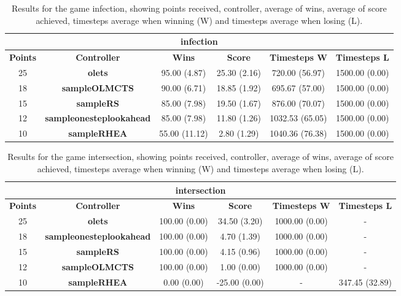 \begin{table*}[!t]
\begin{center}
\begin{tabular}{|c|c|c|c|c|c|}
\multicolumn{6}{c}{\textbf{infection}}\\
\hline
\textbf{Points} & \textbf{Controller} & \textbf{Wins} &  \textbf{Score} & \textbf{Timesteps W} & \textbf{Timesteps L}\\
\hline
25 & \textbf{olets} & 95.00 (4.87) & 25.30 (2.16) & 720.00 (56.97) & 1500.00 (0.00)
 \\
\hline
18 & \textbf{sampleOLMCTS} & 90.00 (6.71) & 18.85 (1.92) & 695.67 (57.00) & 1500.00 (0.00)
 \\
\hline
15 & \textbf{sampleRS} & 85.00 (7.98) & 19.50 (1.67) & 876.00 (70.07) & 1500.00 (0.00)
 \\
\hline
12 & \textbf{sampleonesteplookahead} & 85.00 (7.98) & 11.80 (1.26) & 1032.53 (65.05) & 1500.00 (0.00)
 \\
\hline
10 & \textbf{sampleRHEA} & 55.00 (11.12) & 2.80 (1.29) & 1040.36 (76.38) & 1500.00 (0.00)
 \\
\hline
\end{tabular}
\caption{Results for the game infection, showing points received, controller, average of wins, average of score achieved, timesteps average when winning (W) and timesteps average when losing (L).}
\label{tab:weights}
\end{center}
\end{table*}
\begin{table*}[!t]
\begin{center}
\begin{tabular}{|c|c|c|c|c|c|}
\multicolumn{6}{c}{\textbf{intersection}}\\
\hline
\textbf{Points} & \textbf{Controller} & \textbf{Wins} &  \textbf{Score} & \textbf{Timesteps W} & \textbf{Timesteps L}\\
\hline
25 & \textbf{olets} & 100.00 (0.00) & 34.50 (3.20) & 1000.00 (0.00) &  - 
 \\
\hline
18 & \textbf{sampleonesteplookahead} & 100.00 (0.00) & 4.70 (1.39) & 1000.00 (0.00) &  - 
 \\
\hline
15 & \textbf{sampleRS} & 100.00 (0.00) & 4.15 (0.96) & 1000.00 (0.00) &  - 
 \\
\hline
12 & \textbf{sampleOLMCTS} & 100.00 (0.00) & 1.00 (0.00) & 1000.00 (0.00) &  - 
 \\
\hline
10 & \textbf{sampleRHEA} & 0.00 (0.00) & -25.00 (0.00) &  -  & 347.45 (32.89)
 \\
\hline
\end{tabular}
\caption{Results for the game intersection, showing points received, controller, average of wins, average of score achieved, timesteps average when winning (W) and timesteps average when losing (L).}
\label{tab:weights}
\end{center}
\end{table*}
